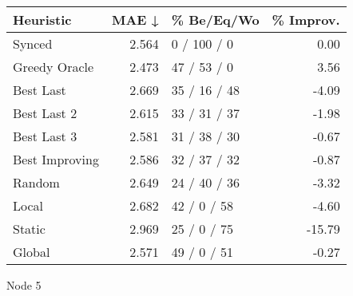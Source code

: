 \begin{tabular}{lrlr}
\toprule
\textbf{Heuristic} & \textbf{MAE ↓} & \textbf{\% Be/Eq/Wo} & \textbf{\% Improv.} \\
\midrule
            Synced &          2.564 &          0 / 100 / 0 &                0.00 \\
     Greedy Oracle &          2.473 &          47 / 53 / 0 &                3.56 \\
         Best Last &          2.669 &         35 / 16 / 48 &               -4.09 \\
       Best Last 2 &          2.615 &         33 / 31 / 37 &               -1.98 \\
       Best Last 3 &          2.581 &         31 / 38 / 30 &               -0.67 \\
    Best Improving &          2.586 &         32 / 37 / 32 &               -0.87 \\
            Random &          2.649 &         24 / 40 / 36 &               -3.32 \\
             Local &          2.682 &          42 / 0 / 58 &               -4.60 \\
            Static &          2.969 &          25 / 0 / 75 &              -15.79 \\
            Global &          2.571 &          49 / 0 / 51 &               -0.27 \\
\bottomrule
\end{tabular}
\caption{Node 5}
\label{tab:hr_iid_lr05_le2_bs2_5}
